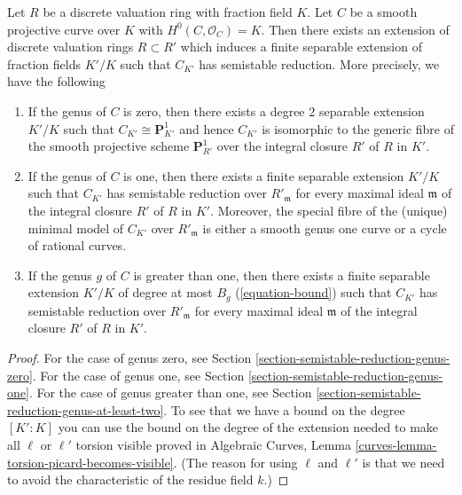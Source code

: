\begin{theorem}
\label{theorem-semistable-reduction}
\begin{reference}
\cite[Corollary 2.7]{DM}
\end{reference}
Let $R$ be a discrete valuation ring with fraction field $K$. Let $C$ be a
smooth projective curve over $K$ with $H^0(C, \mathcal{O}_C) = K$.
Then there exists an extension of discrete valuation rings
$R \subset R'$ which induces a finite separable extension of
fraction fields $K'/K$ such that $C_{K'}$ has semistable reduction.
More precisely, we have the following
\begin{enumerate}
\item If the genus of $C$ is zero, then there exists a degree $2$
separable extension $K'/K$ such that $C_{K'} \cong \mathbf{P}^1_{K'}$
and hence $C_{K'}$ is isomorphic to the generic fibre of the
smooth projective scheme $\mathbf{P}^1_{R'}$ over the integral closure
$R'$ of $R$ in $K'$.
\item If the genus of $C$ is one, then there exists a finite separable
extension $K'/K$ such that $C_{K'}$ has semistable reduction
over $R'_\mathfrak m$ for every maximal ideal $\mathfrak m$
of the integral closure $R'$ of $R$ in $K'$. Moreover, the special
fibre of the (unique) minimal model of $C_{K'}$ over $R'_\mathfrak m$
is either a smooth genus one curve or a cycle of rational curves.
\item If the genus $g$ of $C$ is greater than one, then there exists a
finite separable extension $K'/K$ of degree at most
$B_g$ (\ref{equation-bound}) such that $C_{K'}$ has semistable reduction
over $R'_\mathfrak m$ for every maximal ideal $\mathfrak m$
of the integral closure $R'$ of $R$ in $K'$.
\end{enumerate}
\end{theorem}

\begin{proof}
For the case of genus zero, see
Section \ref{section-semistable-reduction-genus-zero}.
For the case of genus one, see
Section \ref{section-semistable-reduction-genus-one}.
For the case of genus greater than one, see
Section \ref{section-semistable-reduction-genus-at-least-two}.
To see that we have a bound on the degree $[K' : K]$
you can use the bound on the degree of the extension needed
to make all $\ell$ or $\ell'$ torsion visible proved in
Algebraic Curves, Lemma \ref{curves-lemma-torsion-picard-becomes-visible}.
(The reason for using $\ell$ and $\ell'$ is that we need to
avoid the characteristic of the residue field $k$.)
\end{proof}

